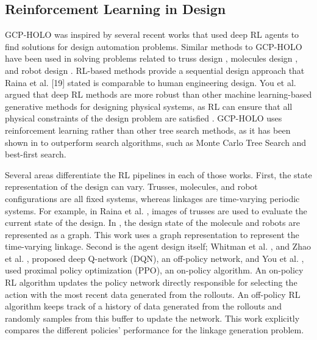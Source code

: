 \subsection{Reinforcement Learning in Design}
GCP-HOLO was inspired by several recent works that used deep RL agents to find solutions for design automation problems. Similar methods to GCP-HOLO have been used in solving problems related to truss design \cite{raina_learning_2019}, molecules design \cite{you_graph_2018}, and robot design \cite{whitman_modular_2020, zhao_robogrammar_2020}. RL-based methods provide a sequential design approach that Raina et al. [19] stated is comparable to human engineering design. You et al. argued that deep RL methods are more robust than other machine learning-based generative methods for designing physical systems, as RL can ensure that all physical constraints of the design problem are satisfied \cite{you_graph_2018}. GCP-HOLO uses reinforcement learning rather than other tree search methods, as it has been shown in \cite{you_graph_2018, whitman_modular_2020, zhao_robogrammar_2020, raina_goal-directed_2021} to outperform search algorithms, such as Monte Carlo Tree Search and best-first search.

Several areas differentiate the RL pipelines in each of those works. First, the state representation of the design can vary. Trusses, molecules, and robot configurations are all fixed systems, whereas linkages are time-varying periodic systems. For example, in Raina et al. \cite{raina_learning_2019}, images of trusses are used to evaluate the current state of the design. In  \cite{you_graph_2018, whitman_modular_2020, zhao_robogrammar_2020}, the design state of the molecule and robots are represented as a graph. This work uses a graph representation to represent the time-varying linkage. Second is the agent design itself; Whitman et al. \cite{whitman_modular_2020}, and Zhao et al. \cite{zhao_robogrammar_2020}, proposed deep Q-network (DQN), an off-policy network, and You et al. \cite{you_graph_2018}, used proximal policy optimization (PPO), an on-policy algorithm. An on-policy RL algorithm updates the policy network directly responsible for selecting the action with the most recent data generated from the rollouts. An off-policy RL algorithm keeps track of a history of data generated from the rollouts and randomly samples from this buffer to update the network. This work explicitly compares the different policies’ performance for the linkage generation problem.

